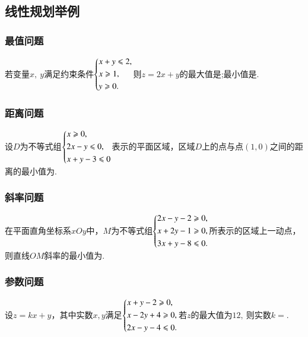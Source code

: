 \documentclass{BHCexam}
\begin{document}
\subsection{线性规划举例}
\subsubsection{最值问题}
\begin{example}
若变量$ x,~y $满足约束条件$ \begin{dcases}
x+y\le 2,\\
x\ge 1,\\
y\ge 0.
\end{dcases} $则$ z=2x+y $的最大值是\tk;最小值是\tk.
\end{example}
\subsubsection{距离问题}
\begin{example}
设$ D $为不等式组$ \begin{dcases}
x\ge 0,\\
2x-y\le 0,\\
x+y-3\le 0
\end{dcases} $表示的平面区域，区域$ D $上的点与点$ (1,0) $之间的距离的最小值为\tk.
\end{example}
\subsubsection{斜率问题}
\begin{example}
在平面直角坐标系$xOy$中，$ M $为不等式组$ \begin{dcases}
2x-y-2\ge 0,\\
x+2y-1\ge 0,\\
3x+y-8\le 0.
\end{dcases} $所表示的区域上一动点，则直线$ OM $斜率的最小值为\tk.
\end{example}

\subsubsection{参数问题}
\begin{example}
设$ z=kx+y $，其中实数$ x,y $满足$\begin{dcases}
x+y-2\ge 0,\\
x-2y+4\ge 0,\\
2x-y-4\le 0.
\end{dcases}$若$ z $的最大值为$ 12,~ $则实数$ k= $\tk.
\end{example}
\end{document}
